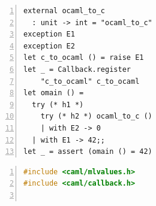 \documentclass[sigplan,screen]{acmart}
\begin{document}
\begin{figure}
\begin{minipage}{0.30\linewidth}
  \begin{minipage}{\linewidth}
    \begin{lstlisting}[numbers=left]
external ocaml_to_c
  : unit -> int = "ocaml_to_c"
exception E1
exception E2
let c_to_ocaml () = raise E1
let _ = Callback.register
    "c_to_ocaml" c_to_ocaml
let omain () =
  try (* h1 *)
    try (* h2 *) ocaml_to_c ()
    | with E2 -> 0
  | with E1 -> 42;;
let _ = assert (omain () = 42)
    \end{lstlisting}
    \label{code:meander_ml}
  \end{minipage}
  \begin{minipage}{\linewidth}
    \begin{lstlisting}[language=c,numbers=left]
#include <caml/mlvalues.h>
#include <caml/callback.h>


\end{lstlisting}
\end{minipage}
\end{minipage}
\end{figure}
\end{document}
